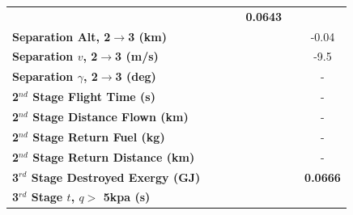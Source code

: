 \begin{table}[ht]
\begin{tabular}{l c c c c c c}
		& \textbf{\secondExergyDestroyedCdStandard}
		& \textbf{\secondExergyDestroyedCdOneHundredFive}
		& \textbf{\secondExergyDestroyedCdOneHundredTen}
		& \textbf{0.0643}
		\\
		\textbf{Separation Alt, 2$\rightarrow$3 (km)}
		& \secondthirdSeparationAltCdNinety
		& \secondthirdSeparationAltCdNinetyFive
		& \secondthirdSeparationAltCdStandard
		& \secondthirdSeparationAltCdOneHundredFive
		& \secondthirdSeparationAltCdOneHundredTen
		&-0.04
		\\
		\textbf{Separation $v$, 2$\rightarrow$3 (m/s)}
		& \secondthirdSeparationvCdNinety
		& \secondthirdSeparationvCdNinetyFive
		& \secondthirdSeparationvCdStandard
		& \secondthirdSeparationvCdOneHundredFive
		& \secondthirdSeparationvCdOneHundredTen
		&-9.5
		\\
		\textbf{Separation $\gamma$, 2$\rightarrow$3 (deg)}
		& \secondthirdSeparationgammaCdNinety
		& \secondthirdSeparationgammaCdNinetyFive
		& \secondthirdSeparationgammaCdStandard
		& \secondthirdSeparationgammaCdOneHundredFive
		& \secondthirdSeparationgammaCdOneHundredTen
		& -
		\\
		\textbf{2$^{nd}$ Stage Flight Time (s)}
		& \secondFlightTimeCdNinety
		& \secondFlightTimeCdNinetyFive
		& \secondFlightTimeCdStandard
		& \secondFlightTimeCdOneHundredFive
		& \secondFlightTimeCdOneHundredTen
		& -
		\\
		\textbf{2$^{nd}$ Stage Distance Flown (km)}
		& \SecondDistCdNinety
		& \SecondDistCdNinetyFive
		& \SecondDistCdStandard
		& \SecondDistCdOneHundredFive
		& \SecondDistCdOneHundredTen
		& -
		\\
		\textbf{2$^{nd}$ Stage Return Fuel (kg)}
		& \returnFuelCdNinety
		& \returnFuelCdNinetyFive
		& \returnFuelCdStandard
		& \returnFuelCdOneHundredFive
		& \returnFuelCdOneHundredTen
		& -
		\\
		\textbf{2$^{nd}$ Stage Return Distance (km)}
		& \returnDistCdNinety
		& \returnDistCdNinetyFive
		& \returnDistCdStandard
		& \returnDistCdOneHundredFive
		& \returnDistCdOneHundredTen
		& -
		\\
		\hline 
		\textbf{3$^{rd}$ Stage Destroyed Exergy (GJ)}
		& \textbf{\thirdExergyDestroyedCdNinety}
		& \textbf{\thirdExergyDestroyedCdNinetyFive}
		& \textbf{\thirdExergyDestroyedCdStandard}
		& \textbf{\thirdExergyDestroyedCdOneHundredFive}
		& \textbf{\thirdExergyDestroyedCdOneHundredTen}
		& \textbf{0.0666}
		\\
		\textbf{3$^{rd}$ Stage $t$, $q >$ 5kpa (s)}
		& \thirdqOverFiveCdNinety
		& \thirdqOverFiveCdNinetyFive
		& \thirdqOverFiveCdStandard

\end{tabular}
\end{table}
